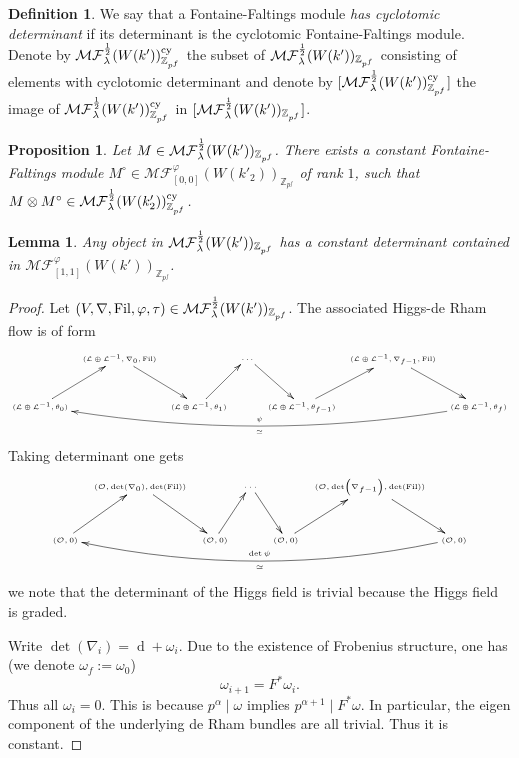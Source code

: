 \documentclass[12pt,twoside]{book}
\theoremstyle{plain}
\newtheorem{lemma}[lemma]{Lemma}
\newtheorem{proposition}[proposition]{Proposition}
\theoremstyle{definition}
\newtheorem{definition}[definition]{Definition}
\theoremstyle{remark}
\newcommand{\bZ}{{\mathbb Z}}
\newcommand{\mL}{{\mathcal L}}
\newcommand{\mO}{{\mathcal O}}
\DeclareMathOperator\rmd{d}
\DeclareMathOperator\Fil{Fil}
\newcommand{\MF}{\mathcal{MF}}
\numberwithin{equation}{section}
\def\MFh{\MF^{{1\over 2}}_{\lambda}}
\begin{document}
\begin{definition}
We say that a Fontaine-Faltings module \emph{has cyclotomic determinant} if its determinant is the cyclotomic Fontaine-Faltings module. Denote by $\MFh(W(k'))_{\bZ_{p^f}}^{\rm cy}$ the subset of $\MFh(W(k'))_{\bZ_{p^f}}$ consisting of elements with cyclotomic determinant and denote by $[\MFh(W(k'))_{\bZ_{p^f}}^{\rm cy}]$ the image of $\MFh(W(k'))_{\bZ_{p^f}}^{\rm cy}$ in $[\MFh(W(k'))_{\bZ_{p^f}}]$.
\end{definition}

\begin{proposition} \label{thm_MFfW2MFWcy}
Let $M \in \MFh(W(k'))_{\bZ_{p^f}}$. There exists a constant Fontaine-Faltings module $M^\circ\in\MF^\varphi_{[0,0]}(W(k'_2))_{\bZ_{p^f}}$ of rank $1$, such that $M\otimes M^\circ \in \MFh(W(k'_2))_{\bZ_{p^f}}^{\rm cy}$.
\end{proposition}

\begin{lemma}
Any object in $\MFh(W(k'))_{\bZ_{p^f}}$ has a constant determinant contained in $\MF^{\varphi}_{[1,1]}(W(k'))_{\bZ_{p^f}}$.
\end{lemma}
\begin{proof} Let $(V,\nabla,\Fil,\varphi,\tau)\in\MFh(W(k'))_{\bZ_{p^f}}$.
The associated Higgs-de Rham flow is of form
\begin{equation*} \tiny
\xymatrix@C=2mm{
&(\mL\oplus \mL^{-1},\nabla_0,\Fil) \ar[dr] && \cdots \ar[dr]&&
(\mL\oplus \mL^{-1},\nabla_{f-1},\Fil)\ar[dr] &
\\
(\mL\oplus \mL^{-1},\theta_0) \ar[ur] &&
(\mL\oplus \mL^{-1},\theta_1) \ar[ur] &&
(\mL\oplus \mL^{-1},\theta_{f-1}) \ar[ur] &&
(\mL\oplus \mL^{-1},\theta_f) \ar@/^16pt/[llllll]^{\simeq}_\psi \\
}
\end{equation*}
Taking determinant one gets
\begin{equation*} \tiny
\xymatrix@C=2mm{
&(\mO,\det(\nabla_0),\det(\Fil)) \ar[dr] && \cdots \ar[dr]&&
(\mO,\det(\nabla_{f-1}),\det(\Fil))\ar[dr] &
\\
(\mO,0) \ar[ur] &&
(\mO,0) \ar[ur] &&
(\mO,0) \ar[ur] &&
(\mO,0) \ar@/^16pt/[llllll]^{\simeq}_{\det\psi} \\
}
\end{equation*}
we note that the determinant of the Higgs field is trivial because the Higgs field is graded.

Write $\det(\nabla_i) = \rmd + \omega_i$. Due to the existence of Frobenius structure, one has (we denote $\omega_{f}:=\omega_0$)
\[\omega_{i+1} = F^*\omega_i.\]
Thus all $\omega_i=0$. This is because $p^\alpha\mid \omega$ implies $p^{\alpha+1}\mid F^*\omega$. In particular, the eigen component of the underlying de Rham bundles are all trivial. Thus it is constant.
\end{proof}
\end{document}
